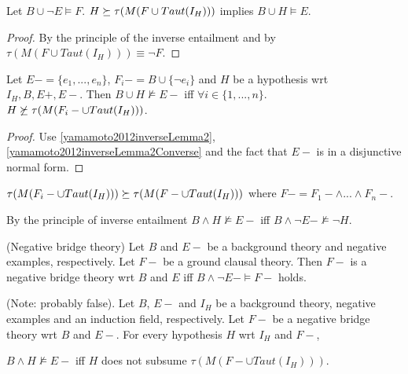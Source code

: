 \begin{lemma}\label{yamamoto2012inverseLemma2Converse}
Let $B \cup \neg E \models F$. $H \succeq \tau(M(F \cup Taut(I_H)))$ implies
$B \cup H \models E$.
\end{lemma}
\begin{proof}
By the principle of the inverse entailment and by $\tau(M(F \cup Taut(I_H))) \equiv \neg F$.
\end{proof}

\begin{lemma}
Let $E-=\{e_1,...,e_n\}$, $F_i-=B \cup \{\neg e_i\}$ and $H$ be
a hypothesis wrt $I_H, B, E+, E-$.
Then $B \cup H \not\models E-$ iff
$\forall i \in \{1,...,n\}.$ $H \not\succeq \tau(M(F_i- \cup Taut(I_H)))$.
\end{lemma}

\begin{proof}
Use \ref{yamamoto2012inverseLemma2}, \ref{yamamoto2012inverseLemma2Converse} and the fact that $E-$ is in a disjunctive normal form.
\end{proof}

\begin{conjecture}
$\tau(M(F_i- \cup Taut(I_H))) \succeq \tau(M(F- \cup Taut(I_H)))$
where $F-=F_1- \wedge ... \wedge F_n-$.
\end{conjecture}

By the principle of inverse entailment
$B \wedge H \not\models E-$ iff
$B \wedge \neg E- \not\models \neg H$.

\begin{defn}
(Negative bridge theory) Let $B$ and $E-$ be a background theory and negative examples, respectively. Let $F-$ be a ground clausal theory. Then $F-$ is a negative bridge theory wrt $B$ and $E$ iff $B \wedge \neg E- \models F-$ holds.
\end{defn}

\begin{conjecture}\label{subsumptionConjectureNegativeExamples}
(Note: probably false).
Let $B$, $E-$ and $I_H$ be a background theory, negative examples and an induction field, respectively. Let $F-$ be a negative bridge theory wrt $B$ and $E-$. For every hypothesis $H$ wrt $I_H$ and $F-$,

$B \wedge H \not\models E-$ iff $H$ does not subsume
$\tau(M(F- \cup Taut(I_H)))$.
\end{conjecture}

